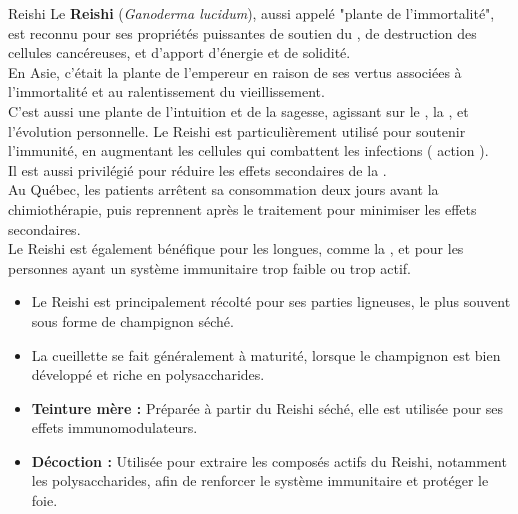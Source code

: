 \ficheidentiteplante
{Reishi}
{%
    Le \textbf{Reishi} (\textit{Ganoderma lucidum}), aussi appelé "plante de l'immortalité", est 
    reconnu pour ses propriétés puissantes de soutien du , 
    de destruction des cellules cancéreuses, et d'apport d'énergie et de solidité. \\
    En Asie, c'était la plante de l'empereur en raison de ses vertus associées à l'immortalité et 
    au ralentissement du vieillissement.\\
    C'est aussi une plante de l'intuition et de la sagesse, agissant sur le , la , et 
    l'évolution personnelle.
}
{%
    Le Reishi est particulièrement utilisé pour soutenir l'immunité, en augmentant les cellules 
    qui combattent les infections ( action  ). \\
    Il est aussi privilégié pour réduire les effets secondaires de la . \\
    Au Québec, les patients arrêtent sa consommation deux jours avant la chimiothérapie, puis 
    reprennent après le traitement pour minimiser les effets secondaires. \\
    Le Reishi est également bénéfique pour les  longues, comme la , 
    et pour les personnes ayant un système immunitaire trop faible ou trop actif.
}
{%
    \begin{itemize}[label = \bcplume]
        \item Le Reishi est principalement récolté pour ses parties ligneuses, le plus souvent sous 
                forme de champignon séché.
        \item La cueillette se fait généralement à maturité, lorsque le champignon est bien 
                développé et riche en polysaccharides.
    \end{itemize}
}
{%
    \begin{itemize}
        \item \textbf{Teinture mère :} Préparée à partir du Reishi séché, elle est utilisée pour 
                ses effets immunomodulateurs.
        \item \textbf{Décoction :} Utilisée pour extraire les composés actifs du Reishi, notamment 
                les polysaccharides, afin de renforcer le système immunitaire et protéger le foie.
    \end{itemize}
}
